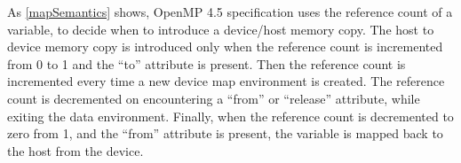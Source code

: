 As \autoref{mapSemantics} shows, OpenMP 4.5 specification uses the reference count of a variable, to decide when to introduce 
a device/host memory copy. The host to device memory copy is 
introduced only when the reference count is incremented from 0 to 1 and the ``to'' attribute is present. 
Then the reference count is incremented every time a 
new device map environment is created. 
The reference count is decremented on encountering a ``from'' or ``release'' 
attribute, while exiting the data environment. 
Finally, when the reference count is decremented to zero from 1, and the 
``from'' attribute is present, 
the variable is mapped back to the host from the device.
\vspace{-10pt}
